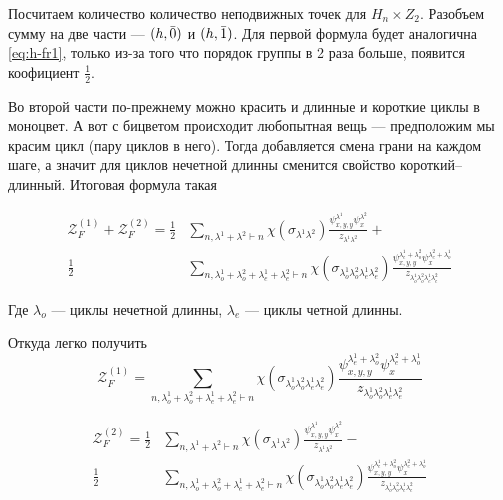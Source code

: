 Посчитаем количество количество неподвижных точек для $H_n \times Z_2$. Разобъем
сумму на две части --- $(h, \Bar 0)$ и $(h, \Bar 1)$. Для первой формула будет
аналогична \ref{eq:h-fr1}, только из-за того что порядок группы в 2 раза больше,
появится коофициент $\frac{1}{2}$.

Во второй части по-прежнему можно красить и длинные и короткие циклы в моноцвет.
А вот с бицветом происходит любопытная вещь --- предположим мы красим цикл (пару
циклов в него). Тогда добавляется смена грани на каждом шаге, а значит для
циклов нечетной длинны сменится свойство короткий--длинный. Итоговая формула
такая 

\begin{equation}
\begin{split}
\mathcal Z_F^{(1)} + \mathcal Z_F^{(2)} = 
\frac{1}{2}&
\sum_{n, \lambda^1 + \lambda^2 \vdash n}\chi(\sigma_{\lambda^1 \lambda^2})
\frac{\psi_{x, y, y}^{\lambda^1} \psi_{x}^{\lambda^2}}{z_{\lambda^1 \lambda^2}}
+ \\
\frac{1}{2}&
\sum_{n, \lambda_o^1 + \lambda_o^2 + \lambda_e^1 + \lambda_e^2 \vdash
n}\chi(\sigma_{\lambda_o^1 \lambda_o^2 \lambda_e^1 \lambda_e^2})
\frac{\psi_{x, y, y}^{\lambda_e^1 + \lambda_o^2} \psi_{x}^{\lambda_e^2 + 
\lambda_o^1}}{z_{\lambda_o^1 \lambda_o^2 \lambda_e^1 \lambda_e^2}}
\end{split}
\end{equation}

Где $\lambda_o$ --- циклы нечетной длинны, $\lambda_e$ ---
циклы четной длинны.

Откуда легко получить
\begin{equation}
\label{eq:h-fr2}
\mathcal Z_F^{(1)} = 
\sum_{n, \lambda_o^1 + \lambda_o^2 + \lambda_e^1 + \lambda_e^2 \vdash
n}\chi(\sigma_{\lambda_o^1 \lambda_o^2 \lambda_e^1 \lambda_e^2})
\frac{\psi_{x, y, y}^{\lambda_e^1 + \lambda_o^2} \psi_{x}^{\lambda_e^2 + 
\lambda_o^1}}{z_{\lambda_o^1 \lambda_o^2 \lambda_e^1 \lambda_e^2}}
\end{equation}

\begin{equation}
\begin{split}
\mathcal Z_F^{(2)} = 
\frac{1}{2}&
\sum_{n, \lambda^1 + \lambda^2 \vdash n}\chi(\sigma_{\lambda^1 \lambda^2})
\frac{\psi_{x, y, y}^{\lambda^1} \psi_{x}^{\lambda^2}}{z_{\lambda^1 \lambda^2}}
- \\
\frac{1}{2}&
\sum_{n, \lambda_o^1 + \lambda_o^2 + \lambda_e^1 + \lambda_e^2 \vdash
n}\chi(\sigma_{\lambda_o^1 \lambda_o^2 \lambda_e^1 \lambda_e^2})
\frac{\psi_{x, y, y}^{\lambda_e^1 + \lambda_o^2} \psi_{x}^{\lambda_e^2 + 
\lambda_o^1}}{z_{\lambda_o^1 \lambda_o^2 \lambda_e^1 \lambda_e^2}}
\end{split}
\end{equation}

